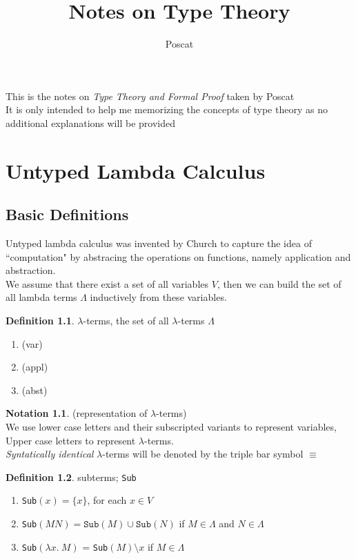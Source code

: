 \documentclass[a4paper]{book}
\title{Notes on Type Theory}
\author{Poscat}
\date{}
\theoremstyle{definition}
\newtheorem{definition}{Definition}[section]
\newtheorem{notation}{Notation}[section]
\begin{document}
\maketitle
{\Large This is the notes on \textit{Type Theory and Formal Proof} taken by Poscat\\
  It is only intended to help me memorizing the concepts of type theory as no
  additional explanations will be provided}
\chapter{Untyped Lambda Calculus}
\section{Basic Definitions}
Untyped lambda calculus was invented by Church to capture the idea of ``computation" by
abstracing the operations on functions, namely application and abstraction.\\
We assume that there exist a set of all variables $V$, then we can build the set of all
lambda terms $\Lambda$ inductively from these variables.
\begin{definition}
  $\lambda$-terms, the set of all $\lambda$-terms $\Lambda$
  \begin{enumerate}
    \item (var) 
    \item (appl) 
    \item (abst) 
  \end{enumerate}
\end{definition}
\begin{notation}
  (representation of $\lambda$-terms)\\
  We use lower case letters and their subscripted variants to represent variables,\\
  Upper case letters to represent $\lambda$-terms.\\
  \textit{Syntatically identical} $\lambda$-terms will be denoted by the triple bar symbol $\equiv$
\end{notation}
\begin{definition}
  subterms; \texttt{Sub}\\
  \begin{enumerate}
    \item \texttt{Sub}$(x) = \{x\}$, for each $x \in V$
    \item \texttt{Sub}$(M N) = \texttt{Sub}(M) \cup \texttt{Sub}(N)$ if $M \in \Lambda$ and $N \in \Lambda$
    \item \texttt{Sub}$(\lambda x.\ M)$ = \texttt{Sub}$(M)\setminus {x}$ if $M \in \Lambda$
  \end{enumerate}
\end{definition}
\end{document}
